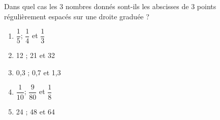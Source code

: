 Dans quel cas les 3 nombres donnés sont-ils les abscisses de 3 points
régulièrement espacés sur une droite graduée ?
\begin{multicols}{5}
  \begin{enumerate}[A/]
  \item $\dfrac15$; $\dfrac14$ et $\dfrac13$
  \item 12 ; 21 et 32
  \item 0,3 ; 0,7 et 1,3
  \item $\dfrac1{10}$; $\dfrac9{80}$ et $\dfrac18$
  \item 24 ; 48 et 64
  \end{enumerate}
\end{multicols}